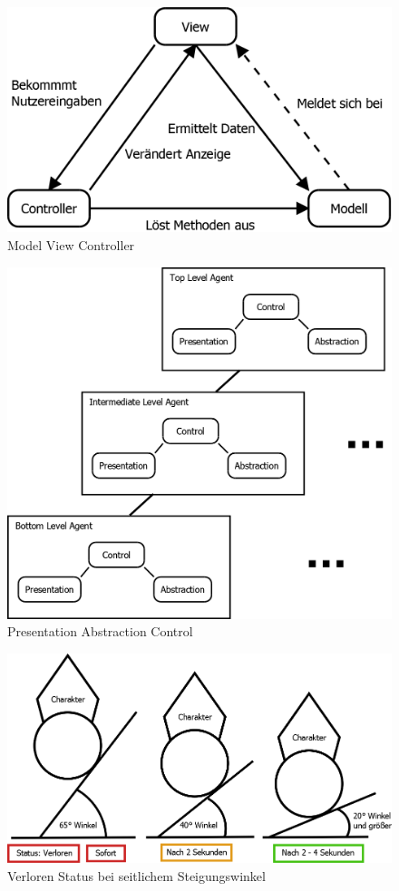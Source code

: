 \begin{figure}[H]
\centering
\caption{Model View Controller}
\label{Abb:MVC}
\includegraphics[scale=0.5]{Bilder/Diagramme/MVC.png}
\end{figure}

\begin{figure}[H]
\centering

\caption{Presentation Abstraction Control}
\label{Abb:PAC}
\includegraphics[scale=0.275]{Bilder/Diagramme/PAC.png}
\end{figure}

\begin{figure}[H]
\centering
\caption{Verloren Status bei seitlichem Steigungswinkel}
\label{Abb:SeitlWinkel}
\includegraphics[scale=0.275]{Bilder/Diagramme/VerlierWinkelSeitlich.png}
\end{figure}